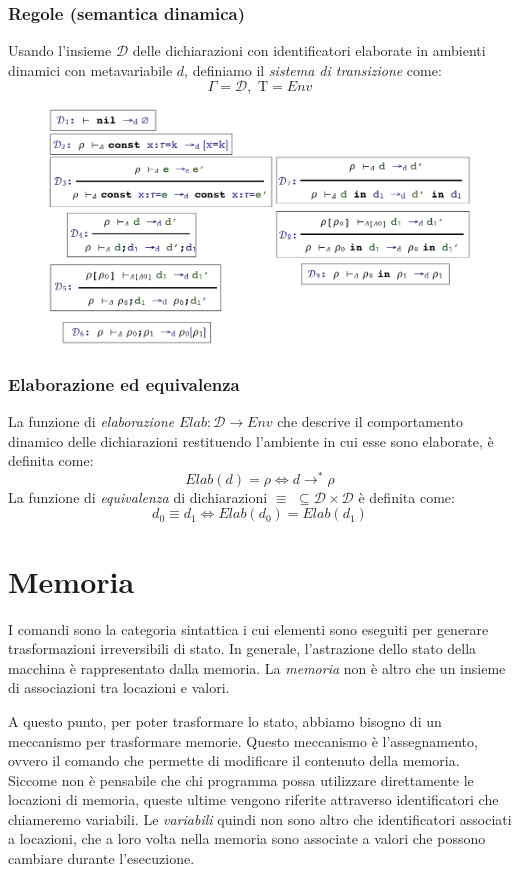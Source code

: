 \documentclass[a4paper,oneside,titlepage]{book}
\begin{document}
\subsection{Regole (semantica dinamica)}
\label{sec:decSemDin1}
Usando l'insieme $\mathcal{D}$ delle dichiarazioni con identificatori elaborate in ambienti dinamici con metavariabile $d$, definiamo il \textit{sistema di transizione} come:
\[ \Gamma = \mathcal{D}, \text{ T} = Env \]
\begin{figure}[htp]
	\centering
	\includegraphics[width=\textwidth, height=\textheight, keepaspectratio]{decRegole2.png}
\end{figure}

\subsection{Elaborazione ed equivalenza}
La funzione di \textit{elaborazione} $Elab: \mathcal{D} \to Env$ che descrive il comportamento dinamico delle dichiarazioni restituendo l'ambiente in cui esse sono elaborate, è definita come:
\[ Elab(d)=\rho \iff d \rightarrow^* \rho \]
La funzione di \textit{equivalenza} di dichiarazioni $\equiv$ $\subseteq \mathcal{D} \times \mathcal{D}$ è definita come:
\[ d_0 \equiv d_1 \iff Elab(d_0)=Elab(d_1) \]


\chapter{Memoria}
I comandi sono la categoria sintattica i cui elementi sono eseguiti per generare trasformazioni irreversibili di stato. In generale, l'astrazione dello stato della macchina è rappresentato dalla memoria. La \textit{memoria} non è altro che un insieme di associazioni tra locazioni e valori.

A questo punto, per poter trasformare lo stato, abbiamo bisogno di un meccanismo per trasformare memorie. Questo meccanismo è l'assegnamento, ovvero il comando che permette di modificare il contenuto della memoria. Siccome non è pensabile che chi programma possa utilizzare direttamente le locazioni di memoria, queste ultime vengono riferite attraverso identificatori che chiameremo variabili. Le \textit{variabili} quindi non sono altro che identificatori associati a locazioni, che a loro volta nella memoria sono associate a valori che possono cambiare durante l'esecuzione.
	
\end{document}
